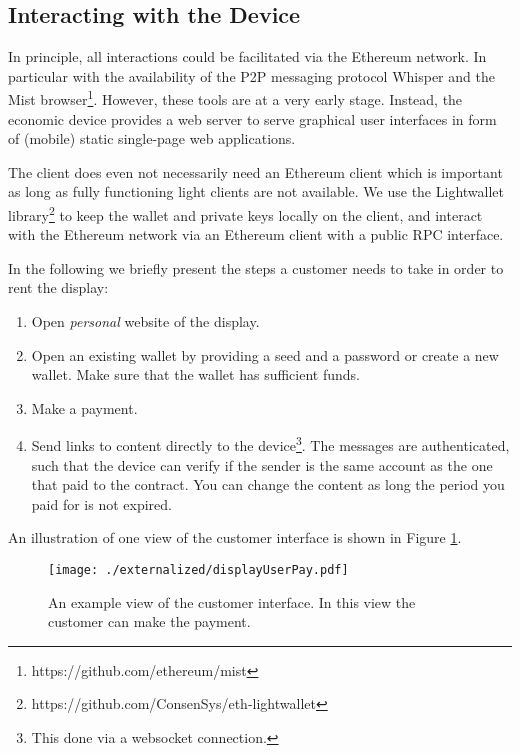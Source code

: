 \subsection{Interacting with the Device}

In principle, all interactions could be facilitated via the Ethereum network. In particular with the availability of the \ac{P2P} messaging protocol Whisper \parencite{whisper} and the Mist browser\footnote{https://github.com/ethereum/mist}. However, these tools are at a very early stage. Instead, the economic device provides a web server to serve graphical user interfaces in form of (mobile) static single-page web applications. 

The client does even not necessarily need an Ethereum client which is important as long as fully functioning light clients are not available. We use the Lightwallet library\footnote{https://github.com/ConsenSys/eth-lightwallet} to keep the wallet and private keys locally on the client, and interact with the Ethereum network via an Ethereum client with a public \ac{RPC} interface.

In the following we briefly present the steps a customer needs to take in order to rent the display: 

\begin{enumerate}
\item Open \emph{personal} website of the display.
\item Open an existing wallet by providing a seed and a password or create a new wallet. Make sure that the wallet has sufficient funds.
\item Make a payment.
\item Send links to content directly to the device\footnote{This done via a websocket\parencite{rfc6455} connection.}. The messages are authenticated, such that the device can verify if the sender is the same account as the one that paid to the contract. You can change the content as long the period you paid for is not expired.
\end{enumerate} 

An illustration of one view of the customer interface is shown in Figure \ref{fig:payview}.

\begin{figure}
 \centering
 \texttt{[image: ./externalized/displayUserPay.pdf]}
 \caption{An example view of the customer interface. In this view the customer can make the payment.}
 \label{fig:payview}
 \end{figure}
 
